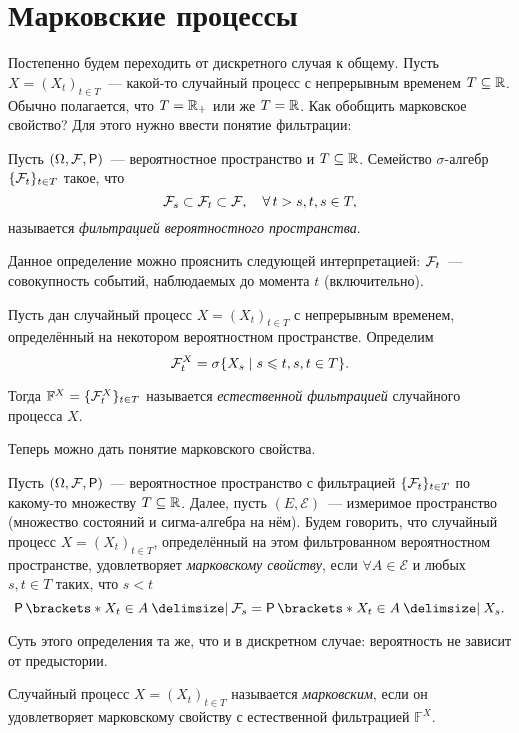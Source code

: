 \section{Марковские процессы}
Постепенно будем переходить от дискретного случая к общему. Пусть \(X = 
(X_{t})_{t \in T}\)~--- какой-то случайный процесс с непрерывным временем \(T 
\subseteq \mathbb{R}\). Обычно полагается, что \(T = \mathbb{R}_{+}\) или же \(T = \mathbb{R}\).  Как 
обобщить марковское свойство? Для этого нужно ввести понятие фильтрации:
\begin{definition}
	Пусть \((\Omega, \F, \Pr)\)~--- вероятностное пространство и \(T \subseteq 
	\mathbb{R}\). Семейство \(\sigma\)-алгебр \(\{\mathcal{F}_{t}\}_{t \in T}\) такое, что
	\[
		\mathcal{F}_{s} \subset \mathcal{F}_{t} \subset \mathcal{F},\quad \forall\,t > s, t, s \in T,
	\]
	называется \emph{фильтрацией вероятностного пространства}.
\end{definition}
Данное определение можно прояснить следующей интерпретацией: \(\mathcal{F}_{t}\)~--- 
совокупность событий, наблюдаемых до момента \(t\) (включительно).

\begin{definition}
	Пусть дан случайный процесс \(X = (X_{t})_{t \in T}\) с непрерывным 
	временем, определённый на некотором вероятностном пространстве. Определим
	\[
		\mathcal{F}_{t}^{X} = \sigma\{X_{s} \mid s \leqslant t, s, t \in T\}.
	\]
	
	Тогда \(\mathbb{F}^{X} = \{\mathcal{F}_{t}^{X}\}_{t \in T}\) называется 
	\emph{естественной фильтрацией} случайного процесса \(X\).
\end{definition}

Теперь можно дать понятие марковского свойства.
\begin{definition}
	Пусть \((\Omega, \F, \Pr)\)~--- вероятностное пространство с фильтрацией 
	\(\{\mathcal{F}_{t}\}_{t \in T}\) по какому-то множеству \(T \subseteq \mathbb{R}\). Далее, 
	пусть \((E, \mathcal{E})\)~--- измеримое пространство (множество состояний 
	и сигма-алгебра на нём). Будем говорить, что случайный процесс \(X = 
	(X_{t})_{t \in T}\), определённый на этом фильтрованном вероятностном 
	пространстве, удовлетворяет \emph{марковскому свойству}, если \(\forall A 
	\in \mathcal{E}\) и любых \(s, t \in T\) таких, что \(s < t\) 
	\[
		\Pr{X_{t} \in A \given \F_{s}} = \Pr{X_{t} \in A \given X_{s}}.
	\]
\end{definition}
Суть этого определения та же, что и в дискретном случае: вероятность не зависит 
от предыстории.
\begin{definition}
	Случайный процесс \(X = (X_{t})_{t \in T}\) называется \emph{марковским}, 
	если он удовлетворяет марковскому свойству с естественной фильтрацией 
	\(\mathbb{F}^{X}\).
\end{definition}

